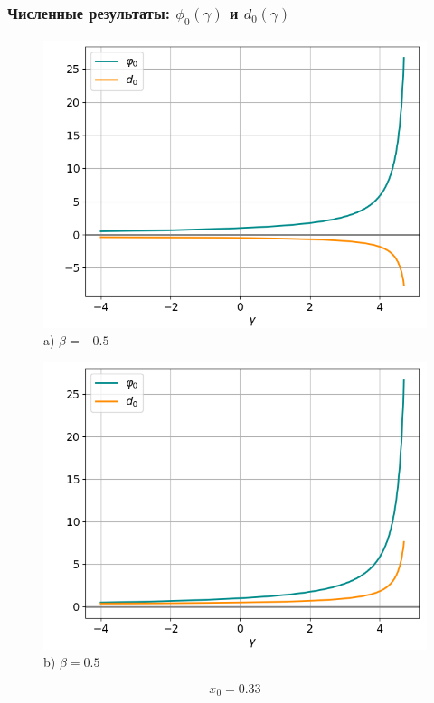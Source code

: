 \documentclass[fullscreen=true, unicode, bookmarks=false]{beamer}
\begin{document}
\begin{frame}
\frametitle{ Численные результаты: $ \phi_0(\gamma) $ и $ d_0(\gamma) $ }

\begin{figure} 
\begin{minipage}[h]{0.49\linewidth}
\begin{center}
\includegraphics[scale=0.34]{divergent_phi0d0_x0=0,33,beta=-0,5.png} \\ {\scriptsize a) $ \beta = -0.5 $}
\end{center}
\end{minipage} 
\hfill
\begin{minipage}[h]{0.49\linewidth}
\begin{center}
\includegraphics[scale=0.34]{divergent_phi0d0_x0=0,33,beta=0,5.png}  \\ {\scriptsize b) $ \beta = 0.5 $}
\end{center}
\end{minipage} 
\end{figure}

$$ x_0 = 0.33 $$

\end{frame}
\end{document}
